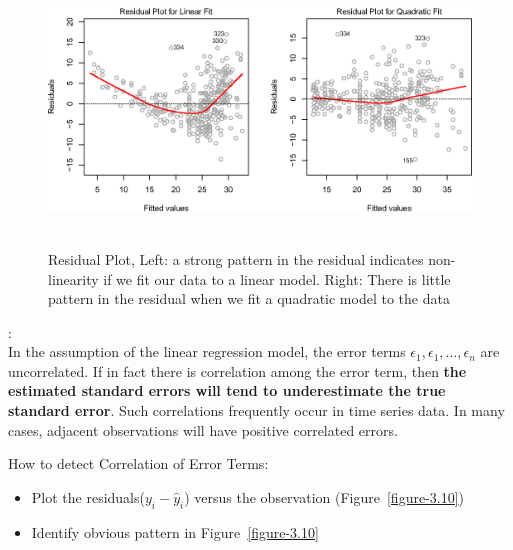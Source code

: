     \documentclass[12pt,fleqn,a4paper]{article}%
\theoremstyle{definition}
\theoremstyle{plain}
\numberwithin{equation}{section}
\begin{document}
\begin{figure}[H]
\centering
\includegraphics[scale=0.85]{images//3_9.eps}
\\~\\
\caption{Residual Plot, Left: a strong pattern in the residual indicates non-linearity if we fit our data to a linear model. Right: There is little pattern in the residual when we fit a quadratic model to the data}\label{figure-3.9}
\end{figure}

\textbf{\color{blue}{2. Correlation of Error Terms}}:\\
In the assumption of the linear regression model, the error terms $\epsilon_{1}, \epsilon_{1}, \dots, \epsilon_{n}$ are uncorrelated. 
If in fact there is correlation among the error term, then \textbf{the estimated standard errors will tend to underestimate the true standard error}.
Such correlations frequently occur in time series data. In many cases, adjacent observations will have positive correlated errors.

How to detect Correlation of Error Terms:
\begin{itemize}
\item Plot the residuals($y_{i}-\hat{y}_{i}$) versus the observation (Figure~\ref{figure-3.10})
\item Identify obvious pattern in Figure~\ref{figure-3.10}
\end{itemize}
\end{document}
